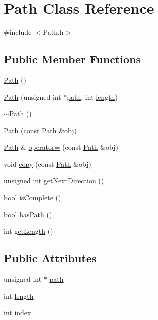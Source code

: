 \hypertarget{classPath}{\section{Path Class Reference}
\label{classPath}
}


{\ttfamily \#include $<$Path.\-h$>$}

\subsection*{Public Member Functions}
\begin{DoxyCompactItemize}
\item 
\hyperlink{classPath_af26cfab021ddf49af73da3b2beca85ac}{Path} ()
\item 
\hyperlink{classPath_ab3bdc2d36faec392cee7036599cac1e8}{Path} (unsigned int $\ast$\hyperlink{classPath_a15e858fcafd08883c9aa4460e9a63961}{path}, int \hyperlink{classPath_a899a5337cfcdac6fb6ff020dd7b4cf7d}{length})
\item 
\hyperlink{classPath_a141da9ff89c85e0ba410b5a73864c267}{$\sim$\-Path} ()
\item 
\hyperlink{classPath_a7e773507a877600083364271852ed19f}{Path} (const \hyperlink{classPath}{Path} \&obj)
\item 
\hyperlink{classPath}{Path} \& \hyperlink{classPath_a8fed62e1c09866defe99985648111462}{operator=} (const \hyperlink{classPath}{Path} \&obj)
\item 
void \hyperlink{classPath_ab9976c0fbf9ef118d8fb321aa904afbc}{copy} (const \hyperlink{classPath}{Path} \&obj)
\item 
unsigned int \hyperlink{classPath_a03ca062f08b780af43c39e27f02425c9}{get\-Next\-Direction} ()
\item 
bool \hyperlink{classPath_a025d58fe0a4ba7e2e525ac39f2e42d48}{is\-Complete} ()
\item 
bool \hyperlink{classPath_ab164e32a921ddff93de3206fbc9223ab}{has\-Path} ()
\item 
int \hyperlink{classPath_adf15aa16c75bdf6a02b9a52af0264a54}{get\-Length} ()
\end{DoxyCompactItemize}
\subsection*{Public Attributes}
\begin{DoxyCompactItemize}
\item 
unsigned int $\ast$ \hyperlink{classPath_a15e858fcafd08883c9aa4460e9a63961}{path}
\item 
int \hyperlink{classPath_a899a5337cfcdac6fb6ff020dd7b4cf7d}{length}
\item 
int \hyperlink{classPath_a2519662bb0102f3b02af7a739d55add7}{index}
\end{DoxyCompactItemize}


